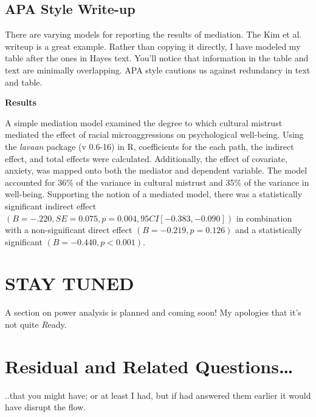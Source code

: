 \documentclass[
  11pt,
]{book}
\begin{document}
\hypertarget{apa-style-write-up}{%
\subsection{APA Style Write-up}\label{apa-style-write-up}}

There are varying models for reporting the results of mediation. The Kim et al. \citep{kim_racial_2017} writeup is a great example. Rather than copying it directly, I have modeled my table after the ones in Hayes \citeyearpar{hayes_introduction_2018} text. You'll notice that information in the table and text are minimally overlapping. APA style cautions us against redundancy in text and table.

\textbf{Results}

A simple mediation model examined the degree to which cultural mistrust mediated the effect of racial microaggressions on psychological well-being. Using the \emph{lavaan} package (v 0.6-16) in R, coefficients for the each path, the indirect effect, and total effects were calculated. Additionally, the effect of covariate, anxiety, was mapped onto both the mediator and dependent variable. The model accounted for 36\% of the variance in cultural mistrust and 35\% of the variance in well-being. Supporting the notion of a mediated model, there was a statistically significant indirect effect \((B = -.220, SE = 0.075, p = 0.004, 95CI[-0.383,-0.090])\) in combination with a non-significant direct effect \((B = -0.219, p = 0.126)\) and a statistically significant \((B = -0.440, p < 0.001)\).

\hypertarget{stay-tuned}{%
\section{STAY TUNED}\label{stay-tuned}}

A section on power analysis is planned and coming soon! My apologies that it's not quite \emph{R}eady.

\hypertarget{residual-and-related-questions}{%
\section{Residual and Related Questions\ldots{}}\label{residual-and-related-questions}}

..that you might have; or at least I had, but if had answered them earlier it would have disrupt the flow.
\end{document}

